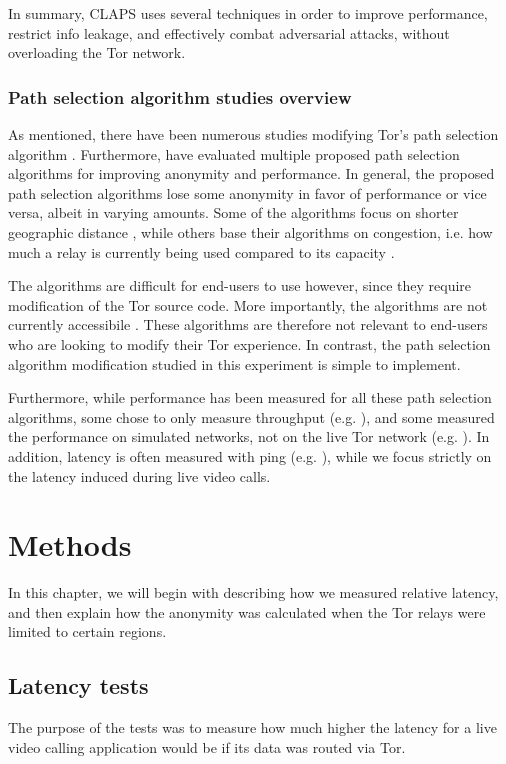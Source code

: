 \documentclass{kththesis}
\begin{document}
In summary, CLAPS uses several techniques in order to improve performance, restrict info leakage, and effectively combat adversarial attacks, without overloading the Tor network.

\subsection{Path selection algorithm studies overview}
As mentioned, there have been numerous studies modifying Tor's path selection algorithm \parencite{CLAPS}\parencite{LASTor}\parencite{5684020}\parencite{1866345}\parencite{wang2012congestion}. Furthermore, \textcite{wacek2013empirical} have evaluated multiple proposed path selection algorithms for improving anonymity and performance. In general, the proposed path selection algorithms lose some anonymity in favor of performance or vice versa, albeit in varying amounts. Some of the algorithms focus on shorter geographic distance \parencite{LASTor}, while others base their algorithms on congestion, i.e. how much a relay is currently being used compared to its capacity \parencite{wang2012congestion}.

The algorithms are difficult for end-users to use however, since they require modification of the Tor source code. More importantly, the algorithms are not currently accessibile \parencite{CLAPSgithub}. These algorithms are therefore not relevant to end-users who are looking to modify their Tor experience. In contrast, the path selection algorithm modification studied in this experiment is simple to implement.

Furthermore, while performance has been measured for all these path selection algorithms, some chose to only measure throughput (e.g. \textcite{5684020}), and some measured the performance on simulated networks, not on the live Tor network (e.g. \textcite{CLAPS}). In addition, latency is often measured with ping (e.g. \textcite{wacek2013empirical}), while we focus strictly on the latency induced during live video calls.

\chapter{Methods}
In this chapter, we will begin with describing how we measured relative latency, and then explain how the anonymity was calculated when the Tor relays were limited to certain regions.

\section{Latency tests}
The purpose of the tests was to measure how much higher the latency for a live video calling application would be if its data was routed via Tor.
\end{document}
